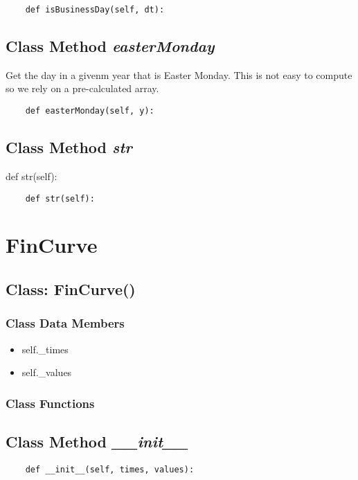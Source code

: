 \documentclass[twoside,11pt]{book}
\begin{document}
\begin{lstlisting}
    def isBusinessDay(self, dt):
\end{lstlisting}

\subsection{Class Method {\it easterMonday}}
Get the day in a givenm year that is Easter Monday. This is not easy to compute so we rely on a pre-calculated array. 

\begin{lstlisting}
    def easterMonday(self, y):
\end{lstlisting}

\subsection{Class Method {\it str}}
def str(self):

\begin{lstlisting}
    def str(self):
\end{lstlisting}

\newpage
\section{FinCurve}

\subsection{Class: FinCurve()}


\subsubsection{Class Data Members}
\begin{itemize}
\item{self.\_times}
\item{self.\_values}
\end{itemize}

\subsubsection{Class Functions}

\subsection{Class Method {\it \_\_init\_\_}}


\begin{lstlisting}
    def __init__(self, times, values):
\end{lstlisting}
\end{document}
